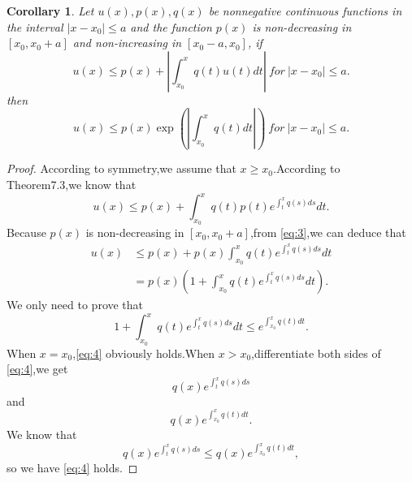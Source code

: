 \documentclass[a4paper, 12pt]{article} %
\newtheorem*{tdtheorem}{Corollary}
\newenvironment{corollary}
{\bigskip\begin{mdframed}[backgroundcolor=gray!40,rightline=false,leftline=false,topline=false,bottomline=false]\begin{tdtheorem}}
    {\end{tdtheorem}\end{mdframed}\bigskip}
\begin{document}
\begin{CJK}{UTF8}{gkai}
  \begin{corollary}
    Let $u(x),p(x),q(x)$ be nonnegative continuous functions in the
    interval $|x-x_0|\leq a$ and the function $p(x)$ is non-decreasing
    in $[x_{0}, x_{0} + a]$ and non-increasing in $[x_{0} - a, x_{0}
    ]$, if
    \begin{equation}
      \label{eq:0}
      u(x)\leq p(x)+\left|\int_{x_0}^xq(t)u(t)dt\right|\ for \
      |x-x_0|\leq a.
    \end{equation}
    then
    \begin{equation}
      \label{eq:1}
      u(x)\leq p(x)\exp\left(\left|\int_{x_0}^xq(t)dt\right|\right)\
      for \ 
      |x-x_0|\leq a.
    \end{equation}
  \end{corollary}
  \begin{proof}
    According to symmetry,we assume that $x\geq x_0$.According to
    Theorem7.3,we know that
 \begin{equation}
      \label{eq:3}
      u(x)\leq p(x)+\int_{x_0}^xq(t)p(t)e^{\int_t^xq(s)ds}dt.
    \end{equation}
    Because $p(x)$ is non-decreasing in $[x_0,x_0+a]$,from
    \eqref{eq:3},we can deduce that
    \begin{align*}
      u(x)&\leq
      p(x)+p(x)\int_{x_0}^xq(t)e^{\int_t^xq(s)ds}dt\\&=p(x)\left(1+\int_{x_0}^{x}q(t)e^{\int_{t}^{x}q(s)ds}dt\right).
      \end{align*}
We only need to prove that
\begin{equation}
  \label{eq:4}
  1+\int_{x_0}^xq(t)e^{\int_t^xq(s)ds}dt\leq e^{\int_{x_0}^xq(t)dt}.
\end{equation}
When $x=x_0$,\eqref{eq:4} obviously holds.When $x>x_0$,differentiate
both sides of \eqref{eq:4},we get
$$
q(x)e^{\int_{t}^xq(s)ds}
$$
and
$$
q(x)e^{\int_{x_0}^xq(t)dt}.
$$
We know that
$$
q(x)e^{\int_t^xq(s)ds}\leq q(x)e^{\int_{x_0}^xq(t)dt},
$$
so we have \eqref{eq:4} holds.  
  \end{proof}
  
  
  
  
  
\end{CJK}
\end{document}
